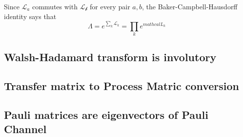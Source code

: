 \documentclass[11pt]{article}
\begin{document}
Since $\mathcal{L}_a$ commutes with $\mathcal{L_b}$ for every pair $a,b$, the Baker-Campbell-Hausdorff identity says that
$$
\Lambda = e^{\sum_k \mathcal{L}_k} = \prod_k e^{mathcal{L}_k}
$$
\subsection*{Walsh-Hadamard transform is involutory}

\subsection*{Transfer matrix to Process Matric conversion}

\subsection*{Pauli matrices are eigenvectors of Pauli Channel}
\end{document}
